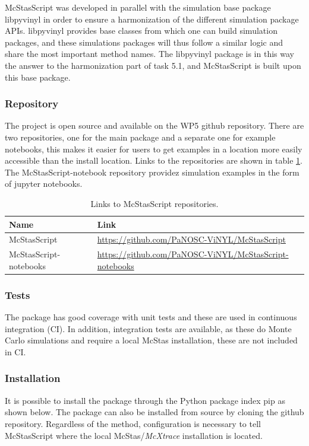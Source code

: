 \documentclass[11pt, a4paper]{article}
\begin{document}
McStasScript was developed in parallel with the simulation base package
libpyvinyl in order to ensure a harmonization of the different simulation
package APIs. libpyvinyl provides base classes from which one can build
simulation packages, and these simulations packages will thus follow a similar
logic and share the most important method names. The libpyvinyl package is in
this way the answer to the harmonization part of task 5.1, and McStasScript is
built upon this base package.

\subsubsection{Repository}
The project is open source and available on the WP5 github repository. There are
two repositories, one for the main package and a separate one for example
notebooks, this makes it easier for users to get examples in a location more
easily accessible than the install location. Links to the repositories are shown
in table \ref{tab:links}. The McStasScript-notebook repository providez
simulation examples in the form of jupyter notebooks.

\begin{table}[h!!!]
\centering
\begin{tabular}{l|l}
Name & Link \\\hline
McStasScript & \href{https://github.com/PaNOSC-ViNYL/McStasScript}{https://github.com/PaNOSC-ViNYL/McStasScript} \\
McStasScript-notebooks &  \href{https://github.com/PaNOSC-ViNYL/McStasScript-notebooks}{https://github.com/PaNOSC-ViNYL/McStasScript-notebooks}
\end{tabular}
\caption{\label{tab:links} Links to McStasScript repositories.}
\end{table}

\subsubsection{Tests}
The package has good coverage with unit tests and these are used in continuous integration (CI). In addition, integration tests are available, as these do Monte Carlo simulations and require a local McStas installation, these are not included in CI.

\subsubsection{Installation}
It is possible to install the package through the Python package index pip as shown below. The package can also be installed from source by cloning the github repository. Regardless of the method, configuration is necessary to tell McStasScript where the local McStas/\textit{McXtrace} installation is located.
\end{document}
